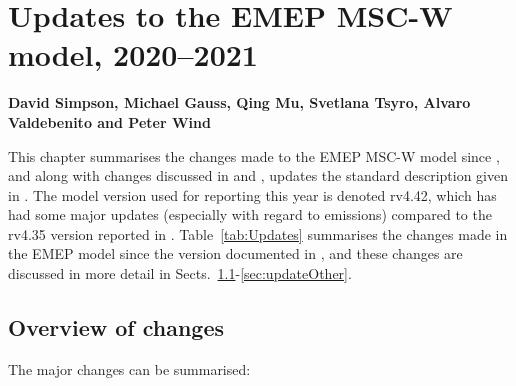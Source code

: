 \chapter[Model updates]{Updates to the EMEP MSC-W model, 2020--2021}
\label{ch:ModelUpdates}

{\bf{David Simpson, Michael Gauss, Qing Mu, Svetlana Tsyro, Alvaro Valdebenito and Peter Wind}}
\vspace{30pt}



This chapter summarises the changes made to the EMEP MSC-W  model
since \citet{R2020:ModDev}, and along with changes discussed in
\citet{R2013:ModDev,R2015:ModDev,R2016:ModDev,R2017:ModDev,R2019:ModDev,R2020:ModDev} and
\citet{R2014:ModDev},
updates the standard description given in \citet{Simpson:EMEP2012}. The
model version used for reporting this year is denoted rv4.42, which has
had some major updates (especially with regard to emissions) compared to
the rv4.35 version reported in \citet{R2020:ModDev}.
Table~\ref{tab:Updates} summarises
the changes made in the EMEP model since the version documented in
\citet{Simpson:EMEP2012}, and these changes are discussed in
more detail in Sects.~\ref{sec:updateOverview}-\ref{sec:updateOther}.

%

\section{Overview of changes} 
\label{sec:updateOverview}

The major changes can be summarised:

